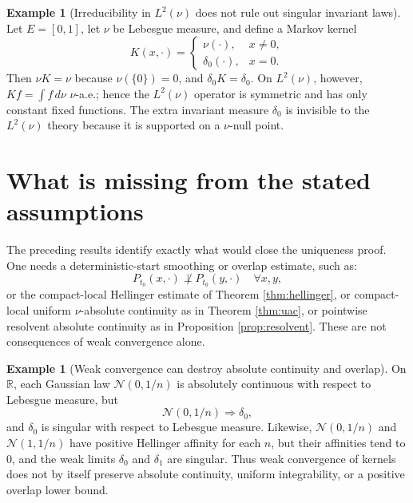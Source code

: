 \documentclass[12pt]{article}
\newcommand{\R}{\mathbb R}
\newcommand{\1}{\mathbf 1}
\newcommand{\dd}{\,d}
\theoremstyle{plain}
\theoremstyle{definition}
\newtheorem{example}[theorem]{Example}
\theoremstyle{remark}
\numberwithin{equation}{section}
\begin{document}
\begin{example}[Irreducibility in \(L^2(\nu)\) does not rule out singular invariant laws]\label{ex:nullmod}
Let \(E=[0,1]\), let \(\nu\) be Lebesgue measure, and define a Markov kernel
\[
K(x,\cdot)=
\begin{cases}
\nu(\cdot),&x\ne0,\\
\delta_0(\cdot),&x=0.
\end{cases}
\]
Then \(\nu K=\nu\) because \(\nu(\{0\})=0\), and \(\delta_0K=\delta_0\).  On
\(L^2(\nu)\), however, \(Kf=\int f\dd\nu\) \(\nu\)-a.e.; hence the \(L^2(\nu)\)
operator is symmetric and has only constant fixed functions.  The extra
invariant measure \(\delta_0\) is invisible to the \(L^2(\nu)\) theory because
it is supported on a \(\nu\)-null point.
\end{example}

\section{What is missing from the stated assumptions}

The preceding results identify exactly what would close the uniqueness proof.
One needs a deterministic-start smoothing or overlap estimate, such as:
\[
P_{t_0}(x,\cdot)\not\perp P_{t_0}(y,\cdot)\quad\forall x,y,
\]
or the compact-local Hellinger estimate of Theorem \ref{thm:hellinger}, or
compact-local uniform \(\nu\)-absolute continuity as in Theorem
\ref{thm:uac}, or pointwise resolvent absolute continuity as in Proposition
\ref{prop:resolvent}.  These are not consequences of weak convergence alone.

\begin{example}[Weak convergence can destroy absolute continuity and overlap]
On \(\R\), each Gaussian law \(\mathcal N(0,1/n)\) is absolutely continuous with
respect to Lebesgue measure, but
\[
\mathcal N(0,1/n)\Rightarrow\delta_0,
\]
and \(\delta_0\) is singular with respect to Lebesgue measure.  Likewise,
\(\mathcal N(0,1/n)\) and \(\mathcal N(1,1/n)\) have positive Hellinger affinity
for each \(n\), but their affinities tend to \(0\), and the weak limits
\(\delta_0\) and \(\delta_1\) are singular.  Thus weak convergence of kernels
does not by itself preserve absolute continuity, uniform integrability, or a
positive overlap lower bound.
\end{example}
\end{document}
